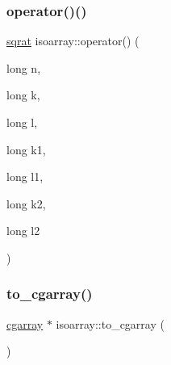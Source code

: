 \mbox{\label{classisoarray_a07114d3b1b8f125d169f10f81884ce16}} 
\subsubsection{\texorpdfstring{operator()()}{operator()()}\hspace{0.1cm}{\footnotesize\ttfamily [2/2]}}
{\footnotesize\ttfamily \mbox{\hyperlink{classsqrat}{sqrat}} isoarray\+::operator() (\begin{DoxyParamCaption}\item[{long}]{n,  }\item[{long}]{k,  }\item[{long}]{l,  }\item[{long}]{k1,  }\item[{long}]{l1,  }\item[{long}]{k2,  }\item[{long}]{l2 }\end{DoxyParamCaption})}

\mbox{\label{classisoarray_a6af30a576928cf3005c5c6464e64b70e}} 
\subsubsection{\texorpdfstring{to\_cgarray()}{to\_cgarray()}\hspace{0.1cm}{\footnotesize\ttfamily [1/2]}}
{\footnotesize\ttfamily \mbox{\hyperlink{classcgarray}{cgarray}} $\ast$ isoarray\+::to\+\_\+cgarray (\begin{DoxyParamCaption}{ }\end{DoxyParamCaption})}

